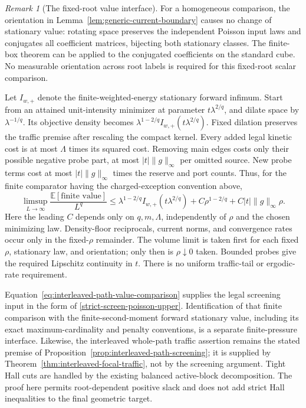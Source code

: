 \documentclass[11pt,reqno]{amsart}
\theoremstyle{definition}
\theoremstyle{remark}
\newtheorem{remark}[theorem]{Remark}
\numberwithin{equation}{section}
\newcommand{\E}{\mathbb E}
\begin{document}
\begin{remark}[The fixed-root value interface]
\label{rem:interleaved-path-value-interface}
For a homogeneous comparison, the orientation in
Lemma~\ref{lem:generic-current-boundary} causes no change of stationary
value: rotating space preserves the independent Poisson input laws and
conjugates all coefficient matrices, bijecting both stationary classes.
The finite-box theorem can be applied to the conjugated coefficients
on the standard cube. No measurable orientation across root labels is
required for this fixed-root scalar comparison.

Let $I_{w,+}$ denote the finite-weighted-energy stationary forward
infimum. Start from an attained unit-intensity minimizer at parameter
$t\lambda^{2/q}$, and dilate space by $\lambda^{-1/q}$.
Its objective density becomes
$\lambda^{1-2/q}I_{w,+}(t\lambda^{2/q})$.
Fixed dilation preserves the traffic premise after rescaling the compact
kernel. Every added legal kinetic cost is at most $\Lambda$ times its
squared cost. Removing main edges costs only their possible negative
probe part, at most $|t|\|g\|_\infty$ per omitted source. New probe
terms cost at most $|t|\|g\|_\infty$ times the reserve and port counts.
Thus, for the finite comparator having the charged-exception convention
above,
\begin{equation}
 \limsup_{L\to\infty}\frac{\E[\text{finite value}]}{L^q}
 \le \lambda^{1-2/q}I_{w,+}(t\lambda^{2/q})
          +C\rho^{1-2/q}+C|t|\|g\|_\infty\rho.
 \label{eq:interleaved-path-value-comparison}
\end{equation}
Here the leading $C$ depends only on $q,m,\Lambda$, independently of
$\rho$ and the chosen minimizing law. Density-floor reciprocals, current
norms, and convergence rates occur only in the fixed-$\rho$ remainder.
The volume limit is taken first for each fixed $\rho$, stationary law,
and orientation; only then is $\rho\downarrow0$ taken.
Bounded probes give the required Lipschitz continuity in $t$.
There is no uniform traffic-tail or ergodic-rate requirement.

Equation~\eqref{eq:interleaved-path-value-comparison} supplies the
legal screening input in the form of
\eqref{strict-screen-poisson-upper}. Identification of that finite
comparison with the finite-second-moment forward stationary value,
including its exact maximum-cardinality and penalty conventions, is
a separate finite-pressure interface. Likewise, the interleaved
whole-path traffic assertion remains the stated premise of
Proposition~\ref{prop:interleaved-path-screening}; it is supplied by
Theorem~\ref{thm:interleaved-focal-traffic}, not by the screening
argument. Tight Hall cuts are handled by the existing balanced
active-block decomposition. The proof here permits root-dependent
positive slack and does not add strict Hall inequalities to the final
geometric target.
\end{remark}
\end{document}
